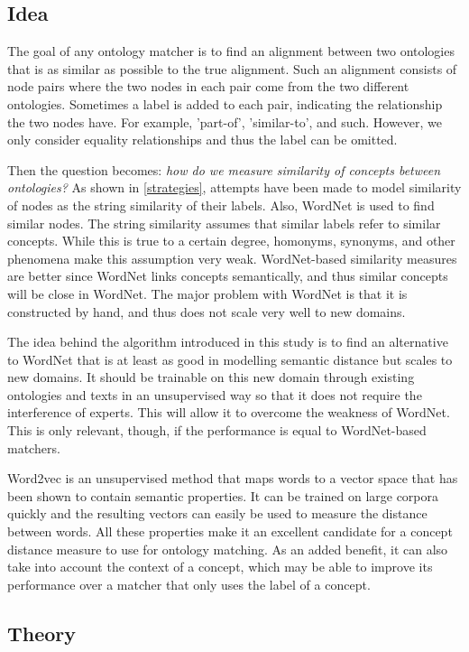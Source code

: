 \documentclass{article}
\begin{document}
 \subsection{Idea}
 The goal of any ontology matcher is to find an alignment between two ontologies that is as similar as possible to the true alignment. Such an alignment consists of node pairs where the two nodes in each pair come from the two different ontologies. Sometimes a label is added to each pair, indicating the relationship the two nodes have. For example, 'part-of', 'similar-to', and such. However, we only consider equality relationships and thus the label can be omitted.
 
 Then the question becomes: \textit{how do we measure similarity of concepts between ontologies?} As shown in \ref{strategies}, attempts have been made to model similarity of nodes as the string similarity of their labels. Also, WordNet is used to find similar nodes. The string similarity assumes that similar labels refer to similar concepts. While this is true to a certain degree, homonyms, synonyms, and other phenomena make this assumption very weak. WordNet-based similarity measures are better since WordNet links concepts semantically, and thus similar concepts will be close in WordNet. The major problem with WordNet is that it is constructed by hand, and thus does not scale very well to new domains.
 
 The idea behind the algorithm introduced in this study is to find an alternative to WordNet that is at least as good in modelling semantic distance but scales to new domains. It should be trainable on this new domain through existing ontologies and texts in an unsupervised way so that it does not require the interference of experts. This will allow it to overcome the weakness of WordNet. This is only relevant, though, if the performance is equal to WordNet-based matchers.
 
 Word2vec is an unsupervised method that maps words to a vector space that has been shown to contain semantic properties. %
 It can be trained on large corpora quickly and the resulting vectors can easily be used to measure the distance between words. All these properties make it an excellent candidate for a concept distance measure to use for ontology matching. As an added benefit, it can also take into account the context of a concept, which may be able to improve its performance over a matcher that only uses the label of a concept.
 \subsection{Theory}
 
\end{document}
